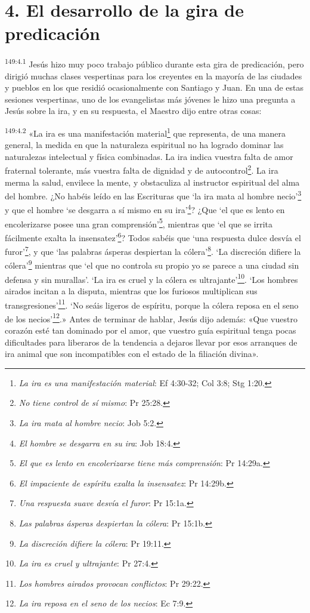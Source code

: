\section*{4. El desarrollo de la gira de predicación}
\par
\textsuperscript{149:4.1} Jesús hizo muy poco trabajo público durante esta gira de predicación, pero dirigió muchas clases vespertinas para los creyentes en la mayoría de las ciudades y pueblos en los que residió ocasionalmente con Santiago y Juan. En una de estas sesiones vespertinas, uno de los evangelistas más jóvenes le hizo una pregunta a Jesús sobre la ira, y en su respuesta, el Maestro dijo entre otras cosas:

\par
\textsuperscript{149:4.2} «La ira es una manifestación material\footnote{\textit{La ira es una manifestación material}: Ef 4:30-32; Col 3:8; Stg 1:20.} que representa, de una manera general, la medida en que la naturaleza espiritual no ha logrado dominar las naturalezas intelectual y física combinadas. La ira indica vuestra falta de amor fraternal tolerante, más vuestra falta de dignidad y de autocontrol\footnote{\textit{No tiene control de sí mismo}: Pr 25:28.}. La ira merma la salud, envilece la mente, y obstaculiza al instructor espiritual del alma del hombre. ¿No habéis leído en las Escrituras que `la ira mata al hombre necio'\footnote{\textit{La ira mata al hombre necio}: Job 5:2.} y que el hombre `se desgarra a sí mismo en su ira'\footnote{\textit{El hombre se desgarra en su ira}: Job 18:4.}? ¿Que `el que es lento en encolerizarse posee una gran comprensión'\footnote{\textit{El que es lento en encolerizarse tiene más comprensión}: Pr 14:29a.}, mientras que `el que se irrita fácilmente exalta la insensatez'\footnote{\textit{El impaciente de espíritu exalta la insensatez}: Pr 14:29b.}? Todos sabéis que `una respuesta dulce desvía el furor'\footnote{\textit{Una respuesta suave desvía el furor}: Pr 15:1a.}, y que `las palabras ásperas despiertan la cólera'\footnote{\textit{Las palabras ásperas despiertan la cólera}: Pr 15:1b.}. `La discreción difiere la cólera'\footnote{\textit{La discreción difiere la cólera}: Pr 19:11.} mientras que `el que no controla su propio yo se parece a una ciudad sin defensa y sin murallas'. `La ira es cruel y la cólera es ultrajante'\footnote{\textit{La ira es cruel y ultrajante}: Pr 27:4.}. `Los hombres airados incitan a la disputa, mientras que los furiosos multiplican sus transgresiones'\footnote{\textit{Los hombres airados provocan conflictos}: Pr 29:22.}. `No seáis ligeros de espíritu, porque la cólera reposa en el seno de los necios'\footnote{\textit{La ira reposa en el seno de los necios}: Ec 7:9.}.» Antes de terminar de hablar, Jesús dijo además: «Que vuestro corazón esté tan dominado por el amor, que vuestro guía espiritual tenga pocas dificultades para liberaros de la tendencia a dejaros llevar por esos arranques de ira animal que son incompatibles con el estado de la filiación divina».

